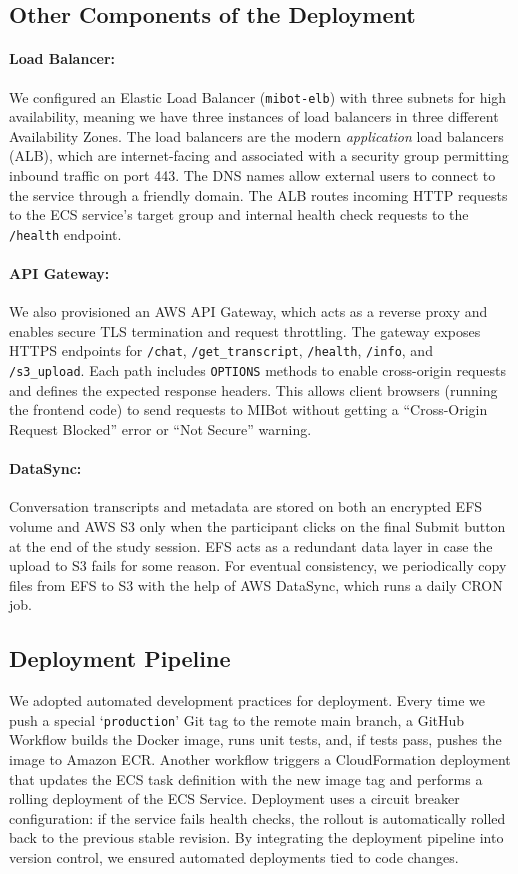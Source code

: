 \subsection{Other Components of the Deployment}

\paragraph{Load Balancer:}We configured an Elastic Load Balancer (\texttt{mibot-elb}) with three subnets for high availability, meaning we have three instances of load balancers in three different Availability Zones. The load balancers are the modern \emph{application} load balancers (ALB), which are internet-facing and associated with a security group permitting inbound traffic on port 443. The DNS names allow external users to connect to the service through a friendly domain. The ALB routes incoming HTTP requests to the ECS service's target group and internal health check requests to the \texttt{/health} endpoint.

\paragraph{API Gateway:}We also provisioned an AWS API Gateway, which acts as a reverse proxy and enables secure TLS termination and request throttling. The gateway exposes HTTPS endpoints for \texttt{/chat}, \texttt{/get\_transcript}, \texttt{/health}, \texttt{/info}, and \texttt{/s3\_upload}. Each path includes \texttt{OPTIONS} methods to enable cross-origin requests and defines the expected response headers. This allows client browsers (running the frontend code) to send requests to MIBot without getting a ``Cross-Origin Request Blocked'' error or ``Not Secure'' warning.

\paragraph{DataSync:}Conversation transcripts and metadata are stored on both an encrypted EFS volume and AWS S3 only when the participant clicks on the final Submit button at the end of the study session. EFS acts as a redundant data layer in case the upload to S3 fails for some reason. For eventual consistency, we periodically copy files from EFS to S3 with the help of AWS DataSync, which runs a daily CRON job.

\subsection{Deployment Pipeline}
We adopted automated development practices for deployment. Every time we push a special `\texttt{production}' Git tag to the remote main branch, a GitHub Workflow builds the Docker image, runs unit tests, and, if tests pass, pushes the image to Amazon ECR. Another workflow triggers a CloudFormation deployment that updates the ECS task definition with the new image tag and performs a rolling deployment of the ECS Service. Deployment uses a circuit breaker configuration: if the service fails health checks, the rollout is automatically rolled back to the previous stable revision. By integrating the deployment pipeline into version control, we ensured automated deployments tied to code changes.
